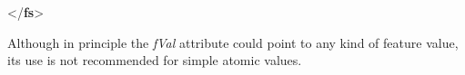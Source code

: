 \begin{shaded}
\hspace*{1em}\mbox{}\newline 
{}\mbox{}\newline 
{}\mbox{}\newline 
\hspace*{1em}\mbox{}\newline 
\hspace*{1em}\hspace*{1em}\mbox{}\newline 
\hspace*{1em}\mbox{}\newline 
{}\mbox{}\newline 
{</\textbf{fs}>}\end{shaded}\egroup\par \par
Although in principle the {\itshape fVal} attribute could point to any kind of feature value, its use is not recommended for simple atomic values.
